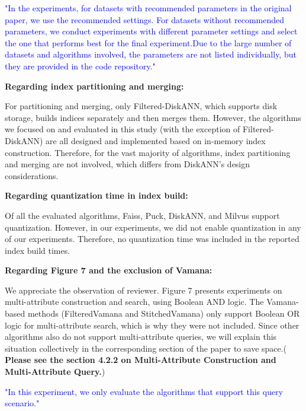 \documentclass[sigconf, nonacm]{acmart}
\begin{document}
	\textcolor{blue}{
"In the experiments, for datasets with recommended parameters in the original paper, we use the recommended settings. For datasets without recommended parameters, we conduct experiments with different parameter settings and select the one that performs best for the final experiment.Due to the large number of datasets and algorithms involved, the parameters are not listed individually, but they are provided in the code repository."}
 
\textbf{Regarding index partitioning and merging:}

For partitioning and merging, only Filtered-DiskANN, which supports disk storage, builds indices separately and then merges them. However, the algorithms we focused on and evaluated in this study (with the exception of Filtered-DiskANN) are all designed and implemented based on in-memory index construction. Therefore, for the vast majority of algorithms, index partitioning and merging are not involved, which differs from DiskANN's design considerations.

\textbf{Regarding quantization time in index build:}

Of all the evaluated algorithms, Faiss, Puck, DiskANN, and Milvus support quantization. However, in our experiments, we did not enable quantization in any of our experiments. Therefore, no quantization time was included in the reported index build times.

\textbf{Regarding Figure 7 and the exclusion of Vamana:}

We appreciate the observation of reviewer. Figure 7 presents experiments on multi-attribute construction and search, using Boolean AND logic. The Vamana-based methods (FilteredVamana and StitchedVamana) only support Boolean OR logic for multi-attribute search, which is why they were not included. Since other algorithms also do not support multi-attribute queries, we will explain this situation collectively in the corresponding section of the paper to save space.(
\textbf{Please see the section 4.2.2 on Multi-Attribute Construction and Multi-Attribute Query.})

\textcolor{blue}{"In this experiment, we only evaluate the algorithms that support this query scenario."}

\end{document}
